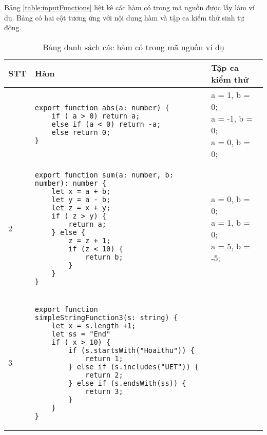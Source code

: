 Bảng \ref{table:inputFunctions} liệt kê các hàm có trong mã nguồn được lấy làm ví dụ. Bảng có hai cột tương ứng với nội dung hàm và tập ca kiểm thử sinh tự động.

\begin{longtable}{|p{0.7cm}|p{10cm}|p{4cm}|}
    \caption{Bảng danh sách các hàm có trong mã nguồn ví dụ}
    \\
         \hline
        \textbf{STT} & \textbf{Hàm} & \textbf{Tập ca kiểm thử}\\
         \hline
         \endhead
         \hline
         \endfoot
        1 & \begin{lstlisting}[language=ES6]
export function abs(a: number) {
    if ( a > 0) return a;
    else if (a < 0) return -a;
    else return 0;
}

        \end{lstlisting}
         & \makecell[l]{a = 1, b = 0;\\ 
         a = -1, b = 0;\\
         a = 0, b = 0;}
        \\
        \hline
        2 & \begin{lstlisting}[language=ES6]
export function sum(a: number, b: number): number {
    let x = a + b;
    let y = a - b;
    let z = x + y;
    if ( z > y) {
        return a;
    } else {
        z = z + 1;
        if (z < 10) {
            return b;
        }
    }
}   
        \end{lstlisting}

        & \makecell[l]{a = 0, b = 0;\\ 
         a = 1, b = 0;\\
         a = 5, b = -5;}
        \\
        \hline
        3 & 
        \begin{lstlisting}[language=ES6]
export function simpleStringFunction3(s: string) {
    let x = s.length +1;
    let ss = "End"
    if ( x > 10) {
        if (s.startsWith("Hoaithu")) {
            return 1;
        } else if (s.includes("UET")) {
            return 2;
        } else if (s.endsWith(ss)) {
            return 3;
        }
    }
}
        \end{lstlisting}
        

\end{longtable}
